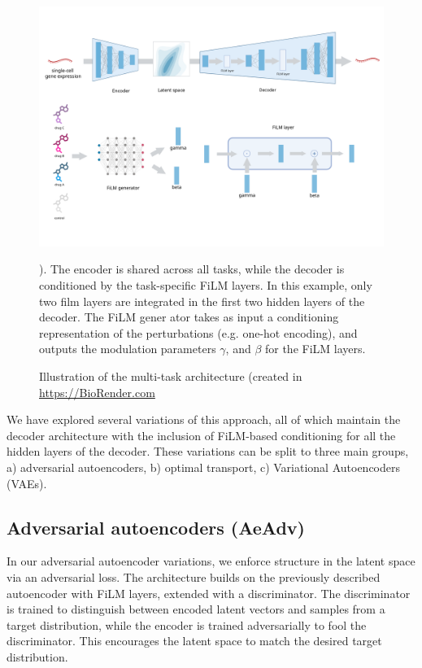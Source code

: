 \documentclass[12pt, a4paper]{article}
\begin{document}

\begin{figure}[h!]
    \includegraphics[width=\textwidth]{biorender_film_architecture.png}
    \caption{Illustration of the multi-task architecture (created in  \url{https://BioRender.com}}). The encoder is shared across all tasks, while the decoder is conditioned by the task-specific FiLM layers. In this example, only two film layers are integrated in the first two hidden layers of the decoder. The FiLM gener ator takes as input a conditioning representation of the perturbations (e.g. one-hot encoding), and outputs the modulation parameters $\gamma$, and $\beta$ for the FiLM layers. 
\end{figure}


We have explored several variations of this approach, all of which maintain the decoder architecture with the inclusion of FiLM-based conditioning for all the hidden layers of the decoder. These variations can be split to three main groups, a) adversarial autoencoders, b) optimal transport, c) Variational Autoencoders (VAEs).

\subsection{Adversarial autoencoders (AeAdv)}

In our adversarial autoencoder variations, we enforce structure in the latent space via an adversarial loss. The architecture builds on the previously described autoencoder with FiLM layers, extended with a discriminator. The discriminator is trained to distinguish between encoded latent vectors and samples from a target distribution, while the encoder is trained adversarially to fool the discriminator. This encourages the latent space to match the desired target distribution.
\end{document}
